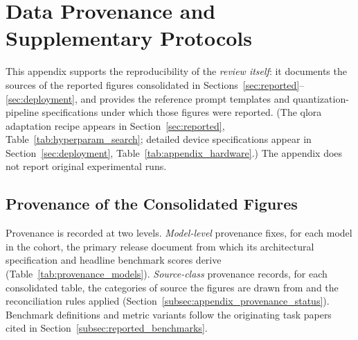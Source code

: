 \section{Data Provenance and Supplementary Protocols}
\label{appendix:supplementary}
\label{app:provenance}

This appendix supports the reproducibility of the \emph{review itself}: it documents the sources of the reported figures consolidated in Sections~\ref{sec:reported}--\ref{sec:deployment}, and provides the reference prompt templates and quantization-pipeline specifications under which those figures were reported. (The \gls{qlora} adaptation recipe appears in Section~\ref{sec:reported}, Table~\ref{tab:hyperparam_search}; detailed device specifications appear in Section~\ref{sec:deployment}, Table~\ref{tab:appendix_hardware}.) The appendix does not report original experimental runs.

\subsection{Provenance of the Consolidated Figures}
\label{subsec:appendix_provenance_table}


Provenance is recorded at two levels. \emph{Model-level} provenance fixes, for
each model in the cohort, the primary release document from which its
architectural specification and headline benchmark scores derive
(Table~\ref{tab:provenance_models}). \emph{Source-class} provenance records, for
each consolidated table, the categories of source the figures are drawn from and
the reconciliation rules applied
(Section~\ref{subsec:appendix_provenance_status}). Benchmark definitions and
metric variants follow the originating task papers cited in
Section~\ref{subsec:reported_benchmarks}.

